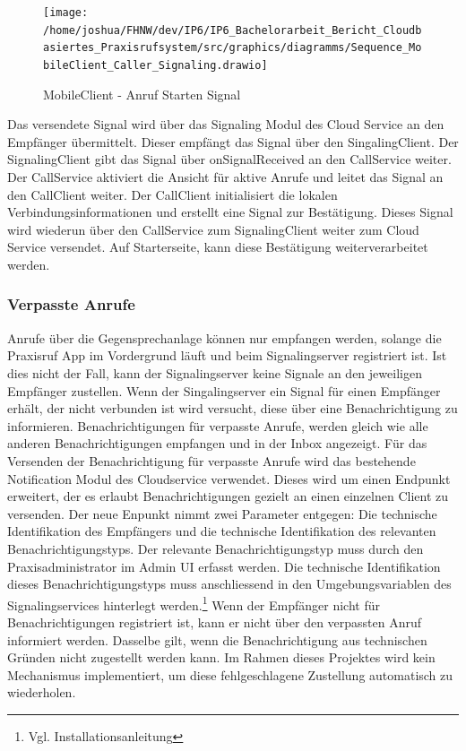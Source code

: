 \clearpage
\begin{figure}[h]
    \centering
    \begin{minipage}[b]{0.8\textwidth}
        \texttt{[image: /home/joshua/FHNW/dev/IP6/IP6\_Bachelorarbeit\_Bericht\_Cloudbasiertes\_Praxisrufsystem/src/graphics/diagramms/Sequence\_MobileClient\_Caller\_Signaling.drawio]}
        \caption{MobileClient - Anruf Starten Signal}
    \end{minipage}
\end{figure}

Das versendete Signal wird über das Signaling Modul des Cloud Service an den Empfänger übermittelt.
Dieser empfängt das Signal über den SingalingClient.
Der SignalingClient gibt das Signal über onSignalReceived an den CallService weiter.
Der CallService aktiviert die Ansicht für aktive Anrufe und leitet das Signal an den CallClient weiter.
Der CallClient initialisiert die lokalen Verbindungsinformationen und erstellt eine Signal zur Bestätigung.
Dieses Signal wird wiederun über den CallService zum SignalingClient weiter zum Cloud Service versendet.
Auf Starterseite, kann diese Bestätigung weiterverarbeitet werden.

\clearpage

\subsubsection{Verpasste Anrufe}

Anrufe über die Gegensprechanlage können nur empfangen werden, solange die Praxisruf App im Vordergrund läuft und beim Signalingserver registriert ist.
Ist dies nicht der Fall, kann der Signalingserver keine Signale an den jeweiligen Empfänger zustellen.
Wenn der Singalingserver ein Signal für einen Empfänger erhält, der nicht verbunden ist wird versucht, diese über eine Benachrichtigung zu informieren.
Benachrichtigungen für verpasste Anrufe, werden gleich wie alle anderen Benachrichtigungen empfangen und in der Inbox angezeigt.
Für das Versenden der Benachrichtigung für verpasste Anrufe wird das bestehende Notification Modul des Cloudservice verwendet.
Dieses wird um einen Endpunkt erweitert, der es erlaubt Benachrichtigungen gezielt an einen einzelnen Client zu versenden.
Der neue Enpunkt nimmt zwei Parameter entgegen:
Die technische Identifikation des Empfängers und die technische Identifikation des relevanten Benachrichtigungstyps.
Der relevante Benachrichtigungstyp muss durch den Praxisadministrator im Admin UI erfasst werden.
Die technische Identifikation dieses Benachrichtigungstyps muss anschliessend in den Umgebungsvariablen des Signalingservices hinterlegt werden.\footnote{Vgl. Installationsanleitung}
Wenn der Empfänger nicht für Benachrichtigungen registriert ist, kann er nicht über den verpassten Anruf informiert werden.
Dasselbe gilt, wenn die Benachrichtigung aus technischen Gründen nicht zugestellt werden kann.
Im Rahmen dieses Projektes wird kein Mechanismus implementiert, um diese fehlgeschlagene Zustellung automatisch zu wiederholen.

